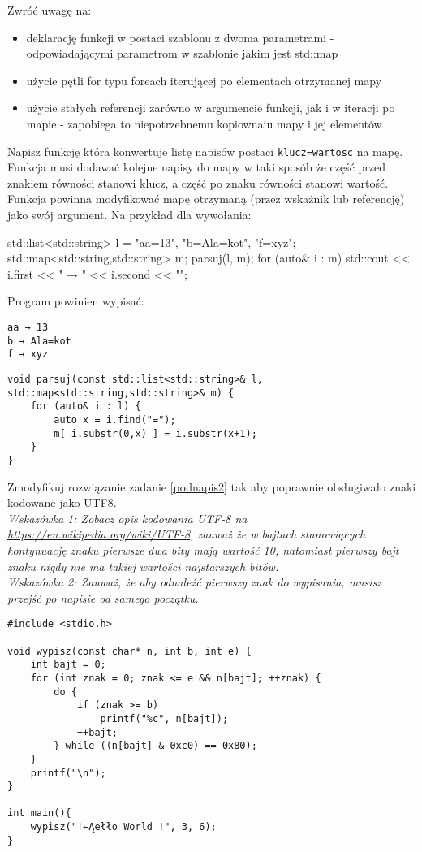 \noindent Zwróć uwagę na:
\begin{itemize}
\item deklarację funkcji w postaci szablonu z dwoma parametrami - odpowiadającymi parametrom w szablonie jakim jest std::map
\item użycie pętli for typu foreach iterującej po elementach otrzymanej mapy
\item użycie stałych referencji zarówno w argumencie funkcji, jak i w iteracji po mapie - zapobiega to niepotrzebnemu kopiownaiu mapy i jej elementów
\end{itemize}
\fi


\dbEntryCheckResults
Napisz funkcję która konwertuje listę napisów postaci \Verb#klucz=wartosc# na mapę.
Funkcja musi dodawać kolejne napisy do mapy w taki sposób że część przed znakiem równości stanowi klucz, a część po znaku równości stanowi wartość.
Funkcja powinna modyfikować mapę otrzymaną (przez wskaźnik lub referencję) jako swój argument. Na przykład dla wywołania:
\begin{CodeFrame*}[cpp]{}
std::list<std::string> l = {"aa=13", "b=Ala=kot", "f=xyz"};
std::map<std::string,std::string> m;
parsuj(l, m);
for (auto& i : m)  std::cout << i.first << " → " << i.second << "\n";
\end{CodeFrame*}
\vspace{-8pt}Program powinien wypisać:
\vspace{-8pt}\begin{Verbatim}
aa → 13
b → Ala=kot
f → xyz
\end{Verbatim}
\fi

\dbEntryCheckResults
\begin{verbatim}
void parsuj(const std::list<std::string>& l, std::map<std::string,std::string>& m) {
	for (auto& i : l) {
		auto x = i.find("=");
		m[ i.substr(0,x) ] = i.substr(x+1);
	}
}
\end{verbatim}
\fi


\dbEntryCheckResults
Zmodyfikuj rozwiązanie zadanie \ref{podnapis2} tak aby poprawnie obsługiwało znaki kodowane jako UTF8.
\\ \textit{
	Wskazówka 1: Zobacz opis kodowania UTF-8 na \url{https://en.wikipedia.org/wiki/UTF-8},
	zauważ że w bajtach stanowiących kontynuację znaku pierwsze dwa bity mają wartość 10,
	natomiast pierwszy bajt znaku nigdy nie ma takiej wartości najstarszych bitów.}
\\ \textit{
	Wskazówka 2: Zauważ, że aby odnaleźć pierwszy znak do wypisania, musisz przejść po napisie od samego początku.}
\fi

\dbEntryCheckResults
\begin{verbatim}
#include <stdio.h>

void wypisz(const char* n, int b, int e) {
	int bajt = 0;
	for (int znak = 0; znak <= e && n[bajt]; ++znak) {
		do {
			if (znak >= b)
				printf("%c", n[bajt]);
			++bajt;
		} while ((n[bajt] & 0xc0) == 0x80);
	}
	printf("\n");
}

int main(){
	wypisz("!←Ąełło World !", 3, 6);
}
\end{verbatim}
\fi
